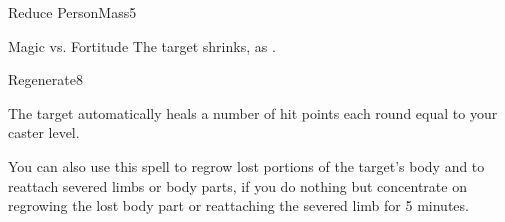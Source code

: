 \begin{spellsection}{Reduce Person}{Mass}{5}
\begin{spellheader}
\end{spellheader}
\begin{spellcontent}
    \begin{spelltargetinginfo}
    \end{spelltargetinginfo}
    \begin{spelleffects}
        \begin{spellattack}{Magic vs. Fortitude}
            \spellsuccess The target shrinks, as .
        \end{spellattack}
        \spelldur \durshort \dismissable
    \end{spelleffects}
\end{spellcontent}
\begin{spellfooter}
\end{spellfooter}
\end{spellsection}

\begin{spellsection}{Regenerate}{8}
\begin{spellheader}
\end{spellheader}
\begin{spellcontent}
    \begin{spelltargetinginfo}
    \end{spelltargetinginfo}
    \begin{spelleffects}
        \spelleffect The target automatically heals a number of hit points each round equal to your caster level.
        \par You can also use this spell to regrow lost portions of the target's body and to reattach severed limbs or body parts, if you do nothing but concentrate on regrowing the lost body part or reattaching the severed limb for 5 minutes.
        \spelldur \durshort
    \end{spelleffects}
\end{spellcontent}
\begin{spellfooter}
\end{spellfooter}
\end{spellsection}

